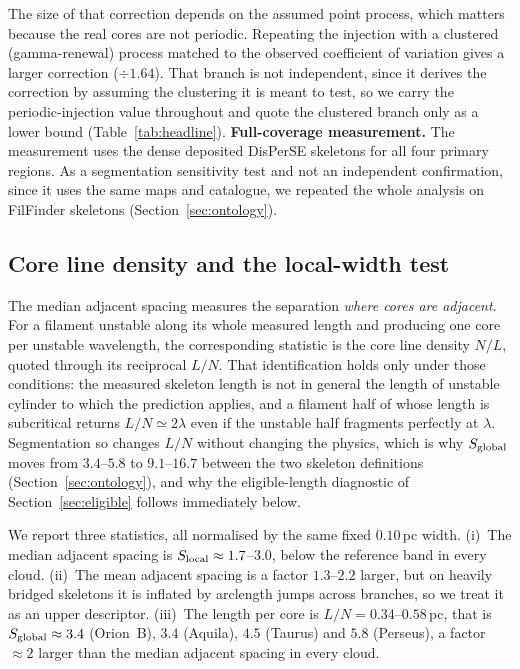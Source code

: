 \documentclass[usenatbib,twoside,twocolumn]{mnras}
\begin{document}
The size of that correction depends on the assumed point process, which matters because the real cores are not periodic. Repeating the injection with a clustered (gamma-renewal) process matched to the observed coefficient of variation gives a larger correction ($\div1.64$). That branch is not independent, since it derives the correction by assuming the clustering it is meant to test, so we carry the periodic-injection value throughout and quote the clustered branch only as a lower bound (Table~\ref{tab:headline}). 
\smallskip\noindent\textbf{Full-coverage measurement.} The measurement uses the dense deposited DisPerSE skeletons for all four primary regions. As a segmentation sensitivity test and not an independent confirmation, since it uses the same maps and catalogue, we repeated the whole analysis on FilFinder skeletons (Section~\ref{sec:ontology}).



\subsection{Core line density and the local-width test}
\label{sec:linedensity}

The median adjacent spacing measures the separation \emph{where cores are adjacent}. For a filament unstable along its whole measured length and producing one core per unstable wavelength, the corresponding statistic is the core line density $N/L$, quoted through its reciprocal $L/N$. That identification holds only under those conditions: the measured skeleton length is not in general the length of unstable cylinder to which the prediction applies, and a filament half of whose length is subcritical returns $L/N\simeq2\lambda$ even if the unstable half fragments perfectly at $\lambda$. Segmentation so changes $L/N$ without changing the physics, which is why $S_{\rm global}$ moves from $3.4$--$5.8$ to $9.1$--$16.7$ between the two skeleton definitions (Section~\ref{sec:ontology}), and why the eligible-length diagnostic of Section~\ref{sec:eligible} follows immediately below.

We report three statistics, all normalised by the same fixed $0.10$\,pc width. (i)~The median adjacent spacing is $S_{\rm local}\approx1.7$--$3.0$, below the reference band in every cloud. (ii)~The mean adjacent spacing is a factor $1.3$--$2.2$ larger, but on heavily bridged skeletons it is inflated by arclength jumps across branches, so we treat it as an upper descriptor. (iii)~The length per core is $L/N=0.34$--$0.58$\,pc, that is $S_{\rm global}\approx3.4$ (Orion~B), $3.4$ (Aquila), $4.5$ (Taurus) and $5.8$ (Perseus), a factor $\approx2$ larger than the median adjacent spacing in every cloud.
\end{document}
